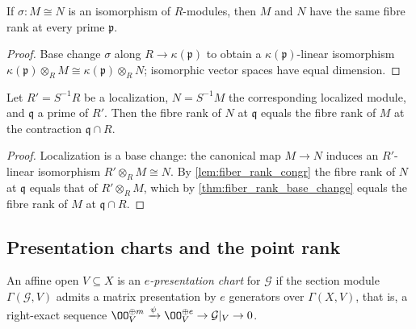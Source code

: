 \begin{lemma}
  \label{lem:fiber_rank_congr}
  \leanok
  If \(\sigma : M \cong N\) is an isomorphism of \(R\)-modules, then \(M\) and
  \(N\) have the same fibre rank at every prime \(\mathfrak p\).
\end{lemma}

\begin{proof}
  \leanok
  Base change \(\sigma\) along \(R \to \kappa(\mathfrak p)\) to obtain a
  \(\kappa(\mathfrak p)\)-linear isomorphism
  \(\kappa(\mathfrak p) \otimes_R M \cong \kappa(\mathfrak p) \otimes_R N\);
  isomorphic vector spaces have equal dimension.
\end{proof}

\begin{corollary}
  \label{cor:fiber_rank_localized}
  \leanok
  Let \(R' = S^{-1}R\) be a localization, \(N = S^{-1}M\) the corresponding
  localized module, and \(\mathfrak q\) a prime of \(R'\).  Then the fibre
  rank of \(N\) at \(\mathfrak q\) equals the fibre rank of \(M\) at the
  contraction \(\mathfrak q \cap R\).
\end{corollary}

\begin{proof}
  \leanok
  Localization is a base change: the canonical map \(M \to N\) induces an
  \(R'\)-linear isomorphism \(R' \otimes_R M \cong N\).  By
  \cref{lem:fiber_rank_congr} the fibre rank of \(N\) at \(\mathfrak q\)
  equals that of \(R' \otimes_R M\), which by \cref{thm:fiber_rank_base_change}
  equals the fibre rank of \(M\) at \(\mathfrak q \cap R\).
\end{proof}

\subsection{Presentation charts and the point rank}

\begin{definition}
  \label{def:presentation_chart}
  \leanok
  An affine open \(V \subseteq X\) is an \emph{\(e\)-presentation chart} for
  \(\mathcal G\) if the section module \(\Gamma(\mathcal G, V)\) admits a
  matrix presentation by \(e\) generators over \(\Gamma(X, V)\), that is, a
  right-exact sequence
  \(\OO_V^{\oplus m} \xrightarrow{\psi} \OO_V^{\oplus e}
    \to \mathcal G|_V \to 0\).
\end{definition}

